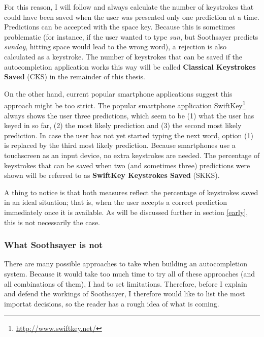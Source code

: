 \documentclass[12pt]{article}
\begin{document}
For this reason, I will follow  and always calculate the number of keystrokes that could have been saved when the user was presented only one prediction at a time. Predictions can be accepted with the space key. Because this is sometimes problematic (for instance, if the user wanted to type \emph{sun}, but Soothsayer predicts \emph{sunday}, hitting space would lead to the wrong word), a rejection is also calculated as a keystroke. The number of keystrokes that can be saved if the autocompletion application works this way will be called \textbf{Classical Keystrokes Saved} (CKS) in the remainder of this thesis.

On the other hand, current popular smartphone applications suggest this approach might be too strict. The popular smartphone application SwiftKey\footnote{\url{http://www.swiftkey.net/}} always shows the user three predictions, which seem to be (1) what the user has keyed in so far, (2) the most likely prediction and (3) the second most likely prediction. In case the user has not yet started typing the next word, option (1) is replaced by the third most likely prediction. Because smartphones use a touchscreen as an input device, no extra keystrokes are needed. The percentage of keystrokes that can be saved when two (and sometimes three) predictions were shown will be referred to as \textbf{SwiftKey Keystrokes Saved} (SKKS).

A thing to notice is that both measures reflect the percentage of keystrokes saved in an ideal situation; that is, when the user accepts a correct prediction immediately once it is available. As will be discussed further in section \ref{early}, this is not necessarily the case. 


\subsubsection{What Soothsayer is not}
There are many possible approaches to take when building an autocompletion system. Because it would take too much time to try all of these approaches (and all combinations of them), I had to set limitations. Therefore, before I explain and defend the workings of Soothsayer, I therefore would like to list the most importat decisions, so the reader has a rough idea of what is coming. 
\end{document}
